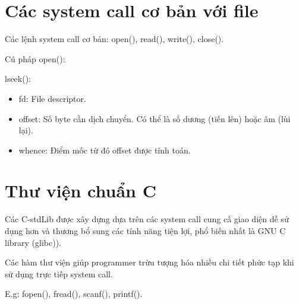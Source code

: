 \documentclass[12pt,a4paper,titlepage]{article}
\begin{document}
	\section{Các system call cơ bản với file}
	\par Các lệnh system call cơ bản: open(), read(), write(), close().
	\par Cú pháp open():
	\begin{center}
	\end{center}
	\par lseek():
	\begin{center}
	\end{center}
	\begin{itemize}
		\item fd: File descriptor.
		\item offset: Số byte cần dịch chuyển. Có thể là số dương (tiến lên) hoặc âm (lùi lại).
		\item whence: Điểm mốc từ đó offset được tính toán.
	\end{itemize}
	\section{Thư viện chuẩn C}
	\par Các C-stdLib được xây dựng dựa trên các system call cung cấ giao diện dễ sử dụng hơn và thương bổ sung các tính năng tiện lợi, phổ biến nhất là GNU C library (glibc)).
	\par Các hàm thư viện giúp programmer trừu tượng hóa nhiều chi tiết phức tạp khi sử dụng trực tiếp system call.
	\par E.g: fopen(), fread(), scanf(), printf().
\end{document}
